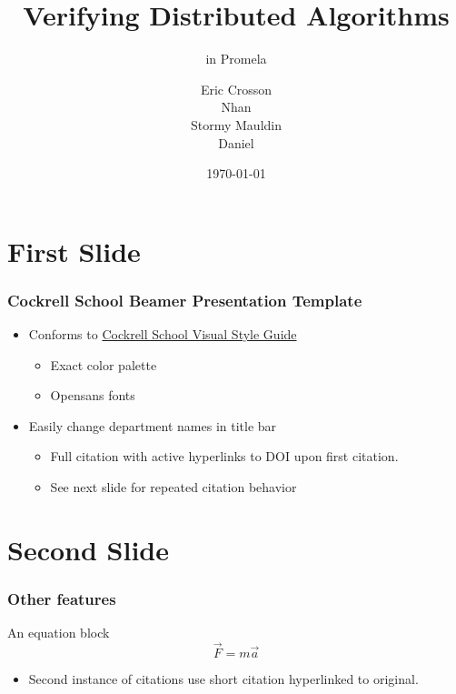 \documentclass[t, pdftex]{beamer}
\title{Verifying Distributed Algorithms}
\subtitle{in Promela}
\author{Eric Crosson \\ Nhan \\ Stormy Mauldin \\ Daniel}
\institute{EE 360P}
\date{\today}
\begin{document}
\titleframe



\section{First Slide}
\begin{frame}
    \frametitle{Cockrell School Beamer Presentation Template}

    \begin{itemize}
        \item Conforms to \href{http://www.engr.utexas.edu/communications/visualguidelines}{Cockrell School Visual Style Guide}
        \begin{itemize}
            \item Exact color palette
            \item Opensans fonts
        \end{itemize}
        \item Easily change department names in title bar
        \begin{itemize}
            \item Full citation with active hyperlinks to DOI upon first citation.
            \item See next slide for repeated citation behavior
        \end{itemize}
    \end{itemize}
\end{frame}

\section{Second Slide}
\begin{frame}[c]
    \frametitle{Other features}
    \begin{block}{An equation block}
        \[ \vec{F} = m \vec{a} \]
    \end{block}
    \begin{itemize}
        \item Second instance of citations use short citation hyperlinked to original.
    \end{itemize}
\end{frame}


\end{document}
